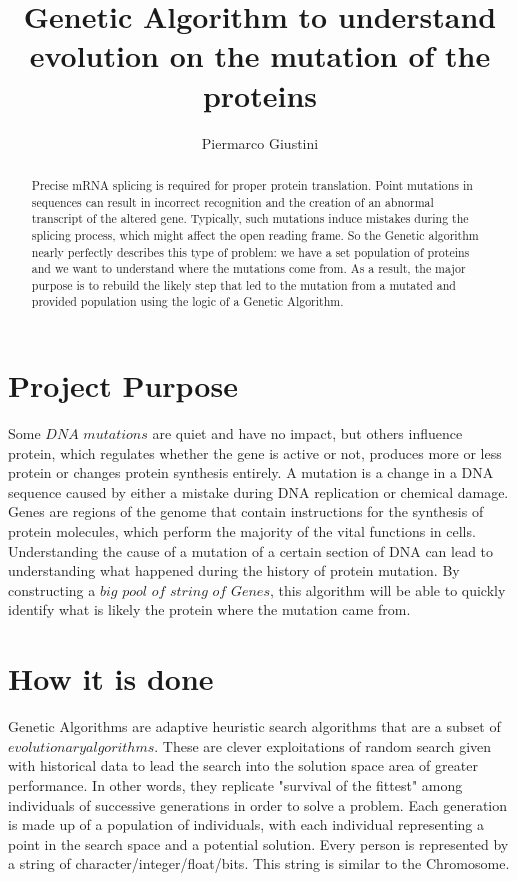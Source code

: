 \documentclass[letterpaper]{article} %
\title{Genetic Algorithm to understand evolution on the mutation of the proteins}
\author {
    Piermarco Giustini 
}
\begin{document}
\maketitle

\begin{abstract}

\noindent Precise mRNA splicing is required for proper protein translation. Point mutations in sequences can result in incorrect recognition and the creation of an abnormal transcript of the altered gene. Typically, such mutations induce mistakes during the splicing process, which might affect the open reading frame. So the Genetic algorithm nearly perfectly describes this type of problem: we have a set population of proteins and we want to understand where the mutations come from. As a result, the major purpose is to rebuild the likely step that led to the mutation from a mutated and provided population using the logic of a Genetic Algorithm.

\end{abstract}

\section{Project Purpose}
Some $DNA$ $mutations$ are quiet and have no impact, but others influence protein, which regulates whether the gene is active or not, produces more or less protein or changes protein synthesis entirely. A mutation is a change in a DNA sequence caused by either a mistake during DNA replication or chemical damage. Genes are regions of the genome that contain instructions for the synthesis of protein molecules, which perform the majority of the vital functions in cells. Understanding the cause of a mutation of a certain section of DNA can lead to understanding what happened during the history of protein mutation.
By constructing a $big$ $pool$ $of$ $string$ $of$ $Genes$, this algorithm will be able to quickly identify what is likely the protein where the mutation came from.

\section{How it is done}
Genetic Algorithms are adaptive heuristic search algorithms that are a subset of $evolutionary algorithms$. These are clever exploitations of random search given with historical data to lead the search into the solution space area of greater performance. 
In other words, they replicate "survival of the fittest" among individuals of successive generations in order to solve a problem. 
Each generation is made up of a population of individuals, with each individual representing a point in the search space and a potential solution. Every person is represented by a string of character/integer/float/bits. This string is similar to the Chromosome. 
\end{document}
